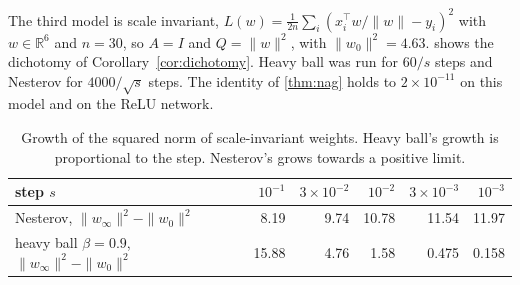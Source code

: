 \documentclass[11pt]{article}
\theoremstyle{remark}
\theoremstyle{definition}
\newcommand{\R}{\mathbb{R}}
\begin{document}
The third model is scale invariant, $L(w)=\frac1{2n}\sum_i(x_i^\top w/\|w\|-y_i)^2$ with $w\in\R^6$ and $n=30$, so $A=I$ and $Q=\|w\|^2$, with $\|w_0\|^2=4.63$.  shows the dichotomy of Corollary~\ref{cor:dichotomy}. Heavy ball was run for $60/s$ steps and Nesterov for $4000/\sqrt s$ steps. The identity of \cref{thm:nag} holds to $2\times10^{-11}$ on this model and on the ReLU network.

\begin{table}[h]
\centering\small
\setlength\tabcolsep{4pt}\begin{tabular}{lrrrrr}
\toprule
step $s$ & $10^{-1}$ & $3\times10^{-2}$ & $10^{-2}$ & $3\times10^{-3}$ & $10^{-3}$\\
\midrule
Nesterov, $\|w_\infty\|^2-\|w_0\|^2$ & 8.19 & 9.74 & 10.78 & 11.54 & 11.97\\
heavy ball $\beta=0.9$, $\|w_\infty\|^2-\|w_0\|^2$ & 15.88 & 4.76 & 1.58 & 0.475 & 0.158\\
\bottomrule
\end{tabular}
\caption{Growth of the squared norm of scale-invariant weights. Heavy ball's growth is proportional to the step. Nesterov's grows towards a positive limit.}
\label{tab:scaleinv}
\end{table}
\end{document}
